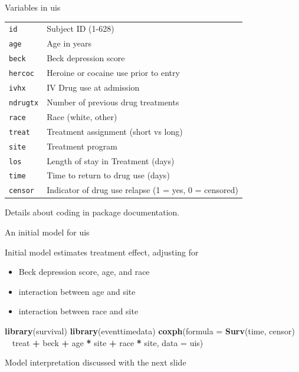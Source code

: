 \documentclass[ignorenonframetext,]{beamer}
\newenvironment{Shaded}{\begin{snugshade}}{\end{snugshade}}
\newcommand{\DataTypeTok}[1]{\textcolor[rgb]{0.13,0.29,0.53}{#1}}
\newcommand{\KeywordTok}[1]{\textcolor[rgb]{0.13,0.29,0.53}{\textbf{#1}}}
\newcommand{\NormalTok}[1]{#1}
\newcommand{\OperatorTok}[1]{\textcolor[rgb]{0.81,0.36,0.00}{\textbf{#1}}}
\newcommand{\StringTok}[1]{\textcolor[rgb]{0.31,0.60,0.02}{#1}}
\providecommand{\tightlist}{%
  \setlength{\itemsep}{0pt}\setlength{\parskip}{0pt}}
\begin{document}
\begin{frame}{%
\protect\hypertarget{variables-in-uis}{%
Variables in uis}}

\begin{tabular}{ll}
 \texttt{id} &  Subject ID (1-628)\\
 \texttt{age} &  Age in years\\
 \texttt{beck} &  Beck depression score\\
 \texttt{hercoc} &  Heroine or cocaine use prior to entry\\
 \texttt{ivhx} &  IV Drug use at admission\\
 \texttt{ndrugtx} &  Number of previous drug treatments\\
 \texttt{race} &  Race (white, other)\\
 \texttt{treat} &  Treatment assignment (short vs long)\\
 \texttt{site} &  Treatment program \\
 \texttt{los} &  Length of stay in Treatment (days)\\
 \texttt{time} &  Time to return to drug use (days)\\
 \texttt{censor} &  Indicator of drug use relapse (1 = yes, 0 = censored)
\end{tabular}

Details about coding in package documentation.

\end{frame}

\begin{frame}[fragile]{%
\protect\hypertarget{an-initial-model-for-uis}{%
An initial model for uis}}

Initial model estimates treatment effect, adjusting for

\begin{itemize}
\tightlist
\item
  Beck depression score, age, and race
\item
  interaction between age and site
\item
  interaction between race and site
\end{itemize}

\begin{Shaded}
\begin{Highlighting}[]
\KeywordTok{library}\NormalTok{(survival)}
\KeywordTok{library}\NormalTok{(eventtimedata)}
\KeywordTok{coxph}\NormalTok{(}\DataTypeTok{formula =} \KeywordTok{Surv}\NormalTok{(time, censor) }\OperatorTok{~}\StringTok{ }\NormalTok{treat }\OperatorTok{+}\StringTok{ }\NormalTok{beck }\OperatorTok{+}
\NormalTok{age }\OperatorTok{*}\StringTok{ }\NormalTok{site }\OperatorTok{+}\StringTok{ }\NormalTok{race }\OperatorTok{*}\StringTok{ }\NormalTok{site, }\DataTypeTok{data =}\NormalTok{ uis)}
\end{Highlighting}
\end{Shaded}

Model interpretation discussed with the next slide

\end{frame}
\end{document}
